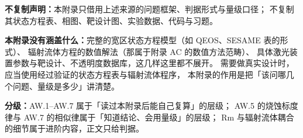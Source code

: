 \textbf{不复制声明：}本附录只借用上述来源的问题框架、判据形式与量级口径；
不复制其状态方程表、相图、靶设计图、实验数据、代码与习题。

\textbf{本附录没有涵盖什么：}完整的宽区状态方程模型（如 QEOS、SESAME 表的形式）、
辐射流体方程的数值解法（那属于附录 AC 的数值方法范畴）、
具体激光装置参数与靶设计、不透明度数据库，这几样这里都不展开。
需要做真实设计时，应当使用经过验证的状态方程表与辐射流体程序，
本附录的作用是把「该问哪几个问题、量级是多少」讲清楚。

\textbf{分级：}AW.1--AW.7 属于「读过本附录后能自己复算」的层级；
AW.5 的烧蚀标度律与 AW.7 的相似律属于「知道结论、会用量级」的层级；
$\mathrm{Rm}$ 与辐射流体耦合的细节属于进阶内容，正文只给判据。
\endgroup
